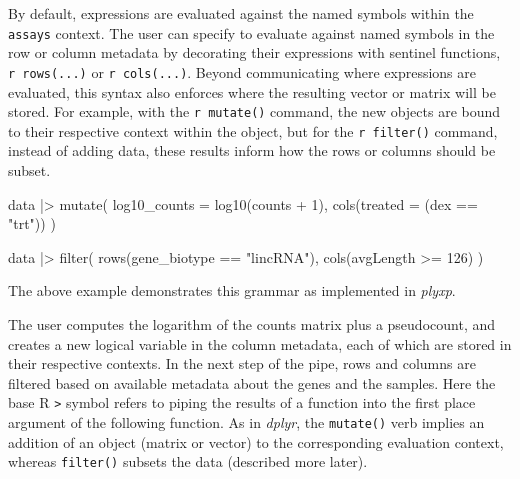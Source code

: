 \documentclass[
  letterpaper,
  DIV=11,
  numbers=noendperiod]{scrartcl}
\newenvironment{Shaded}{\begin{snugshade}}{\end{snugshade}}
\newcommand{\AttributeTok}[1]{\textcolor[rgb]{0.40,0.45,0.13}{#1}}
\newcommand{\DecValTok}[1]{\textcolor[rgb]{0.68,0.00,0.00}{#1}}
\newcommand{\FunctionTok}[1]{\textcolor[rgb]{0.28,0.35,0.67}{#1}}
\newcommand{\NormalTok}[1]{\textcolor[rgb]{0.00,0.23,0.31}{#1}}
\newcommand{\SpecialCharTok}[1]{\textcolor[rgb]{0.37,0.37,0.37}{#1}}
\newcommand{\StringTok}[1]{\textcolor[rgb]{0.13,0.47,0.30}{#1}}
\begin{document}
By default, expressions are evaluated against the named symbols within
the \texttt{assays} context. The user can specify to evaluate against
named symbols in the row or column metadata by decorating their
expressions with sentinel functions, \texttt{r\ rows(...)} or
\texttt{r\ cols(...)}. Beyond communicating where expressions are
evaluated, this syntax also enforces where the resulting vector or
matrix will be stored. For example, with the \texttt{r\ mutate()}
command, the new objects are bound to their respective context within
the object, but for the \texttt{r\ filter()} command, instead of adding
data, these results inform how the rows or columns should be subset.

\begin{Shaded}
\begin{Highlighting}[]
\NormalTok{data }\SpecialCharTok{|\textgreater{}}
  \FunctionTok{mutate}\NormalTok{(}
    \AttributeTok{log10\_counts =} \FunctionTok{log10}\NormalTok{(counts }\SpecialCharTok{+} \DecValTok{1}\NormalTok{),}
    \FunctionTok{cols}\NormalTok{(}\AttributeTok{treated =}\NormalTok{ (dex }\SpecialCharTok{==} \StringTok{"trt"}\NormalTok{))}
\NormalTok{  )}
\end{Highlighting}
\end{Shaded}

\begin{Shaded}
\begin{Highlighting}[]
\NormalTok{data }\SpecialCharTok{|\textgreater{}}
  \FunctionTok{filter}\NormalTok{(}
    \FunctionTok{rows}\NormalTok{(gene\_biotype }\SpecialCharTok{==} \StringTok{"lincRNA"}\NormalTok{),}
    \FunctionTok{cols}\NormalTok{(avgLength }\SpecialCharTok{\textgreater{}=} \DecValTok{126}\NormalTok{)}
\NormalTok{  )}
\end{Highlighting}
\end{Shaded}

The above example demonstrates this grammar as implemented in
\emph{plyxp}.

The user computes the logarithm of the counts matrix plus a pseudocount,
and creates a new logical variable in the column metadata, each of which
are stored in their respective contexts. In the next step of the pipe,
rows and columns are filtered based on available metadata about the
genes and the samples. Here the base R \texttt{\textbar{}\textgreater{}}
symbol refers to piping the results of a function into the first place
argument of the following function. As in \emph{dplyr}, the
\texttt{mutate()} verb implies an addition of an object (matrix or
vector) to the corresponding evaluation context, whereas
\texttt{filter()} subsets the data (described more later).
\end{document}
